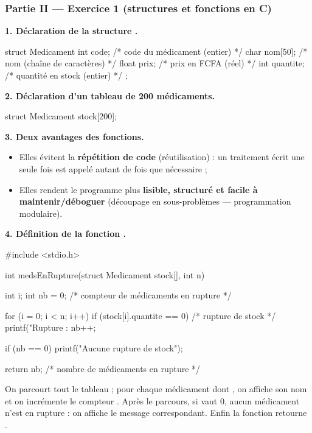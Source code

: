 \subsubsection*{Partie II — Exercice 1 (structures et fonctions en C)}

\textbf{1. Déclaration de la structure .}

\begin{codec}
struct Medicament {
    int   code;        /* code du médicament (entier)        */
    char  nom[50];     /* nom (chaîne de caractères)         */
    float prix;        /* prix en FCFA (réel)                */
    int   quantite;    /* quantité en stock (entier)         */
};
\end{codec}

\medskip
\textbf{2. Déclaration d'un tableau  de 200 médicaments.}

\begin{codec}
struct Medicament stock[200];
\end{codec}

\medskip
\textbf{3. Deux avantages des fonctions.}
\begin{itemize}
  \item Elles évitent la \textbf{répétition de code} (réutilisation) : un traitement écrit
  une seule fois est appelé autant de fois que nécessaire ;
  \item Elles rendent le programme plus \textbf{lisible, structuré et facile à
  maintenir/déboguer} (découpage en sous-problèmes — programmation modulaire).
\end{itemize}

\medskip
\textbf{4. Définition de la fonction .}

\begin{codec}
#include <stdio.h>

int medsEnRupture(struct Medicament stock[], int n) {
    int i;
    int nb = 0;   /* compteur de médicaments en rupture */

    for (i = 0; i < n; i++) {
        if (stock[i].quantite == 0) {      /* rupture de stock */
            printf("Rupture : %
            nb++;
        }
    }

    if (nb == 0) {
        printf("Aucune rupture de stock\n");
    }

    return nb;   /* nombre de médicaments en rupture */
}
\end{codec}

\begin{remarque}
On parcourt tout le tableau ; pour chaque médicament dont , on affiche
son nom et on incrémente le compteur . Après le parcours, si  vaut 0,
aucun médicament n'est en rupture : on affiche le message correspondant. Enfin la fonction
retourne .
\end{remarque}

